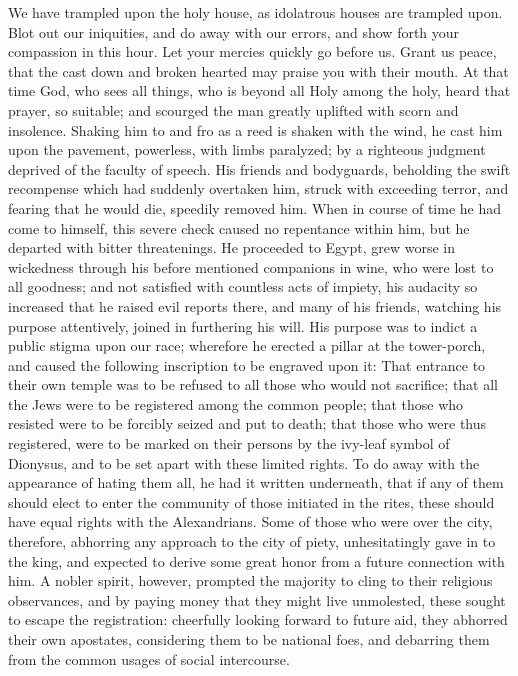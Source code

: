 {We have trampled upon the holy house, as idolatrous houses are trampled upon.
Blot out our iniquities, and do away with our errors, and show forth your compassion in this hour.
Let your mercies quickly go before us. Grant us peace, that the cast down and broken hearted may praise you with their mouth.
At that time God, who sees all things, who is beyond all Holy among the holy, heard that prayer, so suitable; and scourged the man greatly uplifted with scorn and insolence.
Shaking him to and fro as a reed is shaken with the wind, he cast him upon the pavement, powerless, with limbs paralyzed; by a righteous judgment deprived of the faculty of speech.
His friends and bodyguards, beholding the swift recompense which had suddenly overtaken him, struck with exceeding terror, and fearing that he would die, speedily removed him.
When in course of time he had come to himself, this severe check caused no repentance within him, but he departed with bitter threatenings.
He proceeded to Egypt, grew worse in wickedness through his before mentioned companions in wine, who were lost to all goodness;
and not satisfied with countless acts of impiety, his audacity so increased that he raised evil reports there, and many of his friends, watching his purpose attentively, joined in furthering his will.
His purpose was to indict a public stigma upon our race; wherefore he erected a pillar at the tower-porch, and caused the following inscription to be engraved upon it:
That entrance to their own temple was to be refused to all those who would not sacrifice; that all the Jews were to be registered among the common people; that those who resisted were to be forcibly seized and put to death;
that those who were thus registered, were to be marked on their persons by the ivy-leaf symbol of Dionysus, and to be set apart with these limited rights.
To do away with the appearance of hating them all, he had it written underneath, that if any of them should elect to enter the community of those initiated in the rites, these should have equal rights with the Alexandrians.
Some of those who were over the city, therefore, abhorring any approach to the city of piety, unhesitatingly gave in to the king, and expected to derive some great honor from a future connection with him.
A nobler spirit, however, prompted the majority to cling to their religious observances, and by paying money that they might live unmolested, these sought to escape the registration:
cheerfully looking forward to future aid, they abhorred their own apostates, considering them to be national foes, and debarring them from the common usages of social intercourse.

}
